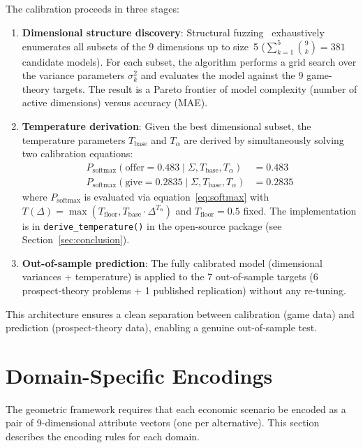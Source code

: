 \documentclass[journal]{IEEEtran}
\begin{document}
The calibration proceeds in three stages:
\begin{enumerate}
    \item \textbf{Dimensional structure discovery}: Structural fuzzing~\cite{bond2026fuzz} exhaustively enumerates all subsets of the 9 dimensions up to size~5 ($\sum_{k=1}^{5} \binom{9}{k} = 381$ candidate models).
    For each subset, the algorithm performs a grid search over the variance parameters $\sigma_k^2$ and evaluates the model against the 9 game-theory targets.
    The result is a Pareto frontier of model complexity (number of active dimensions) versus accuracy (MAE).
    \item \textbf{Temperature derivation}: Given the best dimensional subset, the temperature parameters $T_{\text{base}}$ and $T_\alpha$ are derived by simultaneously solving two calibration equations:
    \begin{align}
        P_{\text{softmax}}(\text{offer} = 0.483 \mid \Sigma, T_{\text{base}}, T_\alpha) &= 0.483 \tag{C1} \\
        P_{\text{softmax}}(\text{give} = 0.2835 \mid \Sigma, T_{\text{base}}, T_\alpha) &= 0.2835 \tag{C2}
    \end{align}
    where $P_{\text{softmax}}$ is evaluated via equation~\eqref{eq:softmax} with $T(\Delta) = \max(T_{\text{floor}}, T_{\text{base}} \cdot \Delta^{T_\alpha})$ and $T_{\text{floor}} = 0.5$ fixed.
    The implementation is in \texttt{derive\_temperature()} in the open-source package (see Section~\ref{sec:conclusion}).
    \item \textbf{Out-of-sample prediction}: The fully calibrated model (dimensional variances + temperature) is applied to the 7 out-of-sample targets (6 prospect-theory problems + 1 published replication) without any re-tuning.
\end{enumerate}

This architecture ensures a clean separation between calibration (game data) and prediction (prospect-theory data), enabling a genuine out-of-sample test.


\section{Domain-Specific Encodings}
\label{sec:encoding}

The geometric framework requires that each economic scenario be encoded as a pair of 9-dimensional attribute vectors (one per alternative).
This section describes the encoding rules for each domain.
\end{document}
